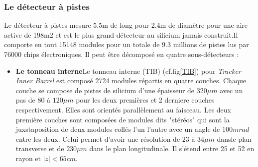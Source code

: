 \subsubsection{Le détecteur à pistes}
Le détecteur à pistes mesure 5.5m de long pour 2.4m de diamètre pour une aire active de 198m2 et est le plus grand détecteur au silicium jamais construit.Il comporte en tout 15148 modules pour un totale de 9.3 millions de pistes lus par 76000 chips électroniques. Il peut être décomposé en quatre sous-détecteurs :

\begin{itemize}[label=$\bullet$]
\item \textbf{Le tonneau interne}Le tonneau interne (TIB) (cf.fig\ref{TIB}) pour  \textit{Tracker Inner Barrel} est composé 2724 modules répartis en quatre couches. Chaque couche se compose de pistes de silicium d'une épaisseur de $320 \mu m$ avec un pas de $80$ à $120\mu m$ pour les deux premières et 2 derniere couches respectivement. Elles sont orientés parallèlement au faisceau. Les deux première couches sont composées de modules dits "stéréos" qui sont la juxstaposition de deux modules collés l'un l'autre avec un angle de $100mrad$ entre les deux. Celui permet d'avoir une résolution de $23$ à $34\mu m$ dansle plan transverse et de $230\mu m$ dans le plan longitudinale. Il s'étend entre 25 et 52 en rayon et $|z|<65cm$.


\end{itemize}
